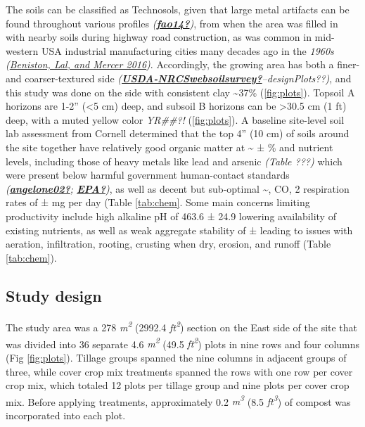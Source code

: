 \documentclass[
]{article}
\begin{document}
The soils can be classified as Technosols, given that large metal artifacts can be found throughout various profiles \emph{(\protect\hyperlink{ref-fao14}{\textbf{fao14?}})}, from when the area was filled in with nearby soils during highway road construction, as was common in mid-western USA industrial manufacturing cities many decades ago in the \emph{1960s} \emph{(\protect\hyperlink{ref-beniston16}{Beniston, Lal, and Mercer 2016})}.
Accordingly, the growing area has both a finer- and coarser-textured side \emph{(\protect\hyperlink{ref-USDA-NRCSwebsoilsurvey}{\textbf{USDA-NRCSwebsoilsurvey?}}--designPlots??)},
and this study was done on the side with consistent clay \textasciitilde37\% (\ref{fig:plots}).
Topsoil A horizons are 1-2'' (\textless5 cm) deep, and subsoil B horizons can be \textgreater30.5 cm (1 ft) deep, with a muted yellow color \emph{YR\#\#?!} (\ref{fig:plots}).
A baseline site-level soil lab assessment from Cornell determined that the top 4'' (10 cm) of soils around the site together have relatively good organic matter at \textasciitilde{} ± \% and nutrient levels, including those of heavy metals like lead and arsenic \emph{(Table ???)} which were present below harmful government human-contact standards \emph{(\protect\hyperlink{ref-angelone02}{\textbf{angelone02?}}; \protect\hyperlink{ref-EPA}{\textbf{EPA?}})}, as well as decent but sub-optimal \textasciitilde, CO, 2 respiration rates of ± mg per day (Table \ref{tab:chem}.
Some main concerns limiting productivity include high alkaline pH of 463.6 ± 24.9 lowering availability of existing nutrients, as well as weak aggregate stability of ± leading to issues with aeration, infiltration, rooting, crusting when dry, erosion, and runoff (Table \ref{tab:chem}).

\hypertarget{study-design}{%
\subsection{Study design}\label{study-design}}

The study area was a 278 \emph{m\textsuperscript{2}} (2992.4 \emph{ft\textsuperscript{2}}) section on the East side of the site that was divided into 36 separate 4.6 \emph{m\textsuperscript{2}} (49.5 \emph{ft\textsuperscript{2}}) plots in nine rows and four columns (Fig \ref{fig:plots}).
Tillage groups spanned the nine columns in adjacent groups of three, while cover crop mix treatments spanned the rows with one row per cover crop mix, which totaled 12 plots per tillage group and nine plots per cover crop mix.
Before applying treatments, approximately 0.2 \emph{m\textsuperscript{3}} (8.5 \emph{ft\textsuperscript{3}}) of compost was incorporated into each plot.
\end{document}

